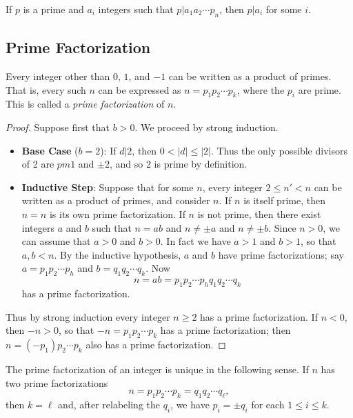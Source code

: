 \documentclass{article}
\begin{document}
\begin{cor}
If $p$ is a prime and $a_i$ integers such that $p|a_1a_2 \cdots p_n$, then $p|a_i$ for some $i$.
\end{cor}



\subsection*{Prime Factorization}

\begin{thm}
Every integer other than $0$, $1$, and $-1$ can be written as a product of primes. That is, every such $n$ can be expressed as $n = p_1p_2 \cdots p_k$, where the $p_i$ are prime. This is called a \emph{prime factorization} of $n$.
\end{thm}

\begin{proof}
Suppose first that $b > 0$. We proceed by strong induction.
\begin{itemize}
\item \textbf{Base Case} ($b = 2$): If $d|2$, then $0 < |d| \leq |2|$. Thus the only possible divisors of 2 are $pm 1$ and $\pm 2$, and so 2 is prime by definition.
\item \textbf{Inductive Step}: Suppose that for some $n$, every integer $2 \leq n' < n$ can be written as a product of primes, and consider $n$. If $n$ is itself prime, then $n = n$ is its own prime factorization. If $n$ is not prime, then there exist integers $a$ and $b$ such that $n = ab$ and $n \neq \pm a$ and $n \neq \pm b$. Since $n > 0$, we can assume that $a > 0$ and $b > 0$. In fact we have $a > 1$ and $b > 1$, so that $a,b < n$. By the inductive hypothesis, $a$ and $b$ have prime factorizations; say $a = p_1p_2 \cdots p_h$ and $b = q_1q_2 \cdots q_k$. Now \[ n = ab = p_1p_2 \cdots p_h q_1q_2 \cdots q_k \] has a prime factorization.
\end{itemize}
Thus by strong induction every integer $n \geq 2$ has a prime factorization. If $n < 0$, then $-n > 0$, so that $-n = p_1p_2 \cdots p_k$ has a prime factorization; then $n = (-p_1)p_2 \cdots p_k$ also has a prime factorization.
\end{proof}

\begin{thm}
The prime factorization of an integer is unique in the following sense. If $n$ has two prime factorizations \[ n = p_1p_2 \cdots p_k = q_1q_2 \cdots q_\ell, \] then $k = \ell$ and, after relabeling the $q_i$, we have $p_i = \pm q_i$ for each $1 \leq i \leq k$.
\end{thm}
\end{document}
